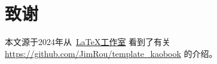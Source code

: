 \chapter*{\centering 致谢} 

本文源于2024年从~\href{https://www.latexstudio.net/}{\LaTeX 工作室} 看到了有关 ~\\\url{https://github.com/JimRou/template_kaobook} 的介绍。